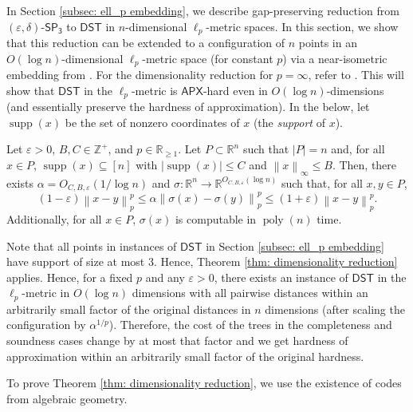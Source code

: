 \documentclass{theoretics}
\DeclareMathOperator{\poly}{poly}
\DeclareMathOperator{\supp}{supp}
\newcommand{\R}{\mathbb{R}}
\newcommand{\Z}{\mathbb{Z}}
\newcommand{\1}{\textbf{1}}
\newcommand{\norm}[1]{\left\lVert#1\right\rVert}
\newcommand{\setpT}{$\mathsf{SP_3}$\xspace}
\newcommand{\dst}{$\mathsf{DST}$\xspace}
\newcommand{\apx}{$\mathsf{APX}$\xspace}
\begin{document}
In Section \ref{subsec: ell_p embedding}, we describe gap-preserving reduction from $(\varepsilon, \delta)$-\setpT to  \dst in $n$-dimensional $\ell_p$-metric spaces. In this section, we show that this reduction can be extended to a configuration of $n$ points in an $O(\log n)$-dimensional $\ell_p$-metric space (for constant $p$) via a near-isometric embedding from \cite{CK19,CKL22}. For the dimensionality reduction for $p = \infty$, refer to \cite{CK19}. This will show that \dst in the $\ell_p$-metric is \apx-hard even in $O( \log n)$-dimensions (and essentially preserve the hardness of approximation).  In the below, let $\supp(x)$ be the set of nonzero coordinates of $x$ (the \textit{support} of $x$).

\begin{theorem} \label{thm: dimensionality reduction}
Let $\varepsilon > 0$, $B, C \in \Z^+$, and $p \in \R_{\geq 1}$. Let $P \subset \R^n$ such that $|P| = n$ and, for all $x \in P$, $\supp(x)  \subseteq [n]$ with $|\supp(x)| \leq C$ and $\norm{x}_{\infty} \leq B$. Then, there exists $\alpha = O_{C,B,\varepsilon}(1/\log n)$ and $\sigma : \R^n \to \R^{O_{C,B, \varepsilon}(\log n)}$ such that, for all $x, y \in P$,
\[
(1 - \varepsilon) \norm{x - y}_p^p \leq \alpha \norm{\sigma(x) - \sigma(y)}_p^p \leq (1 + \varepsilon)\norm{x - y}_p^p.
\]
Additionally, for all $x \in P$, $\sigma(x)$ is computable in $\poly(n)$ time.
\end{theorem}
%
Note that all points in instances of \dst in Section \ref{subsec: ell_p embedding} have support of size at most $3$. Hence, Theorem \ref{thm: dimensionality reduction} applies. Hence, for a fixed $p$ and any $\varepsilon > 0$, there exists an instance of \dst in the $\ell_p$-metric in $O(\log n)$ dimensions with all pairwise distances within an arbitrarily small factor of the original distances in $n$ dimensions (after scaling the configuration by $\alpha^{1/p}$). Therefore, the cost of the trees in the completeness and soundness cases change by at most that factor and we get hardness of approximation within an arbitrarily small factor of the original hardness.

To prove Theorem \ref{thm: dimensionality reduction}, we use the existence of codes from algebraic geometry.
\end{document}
